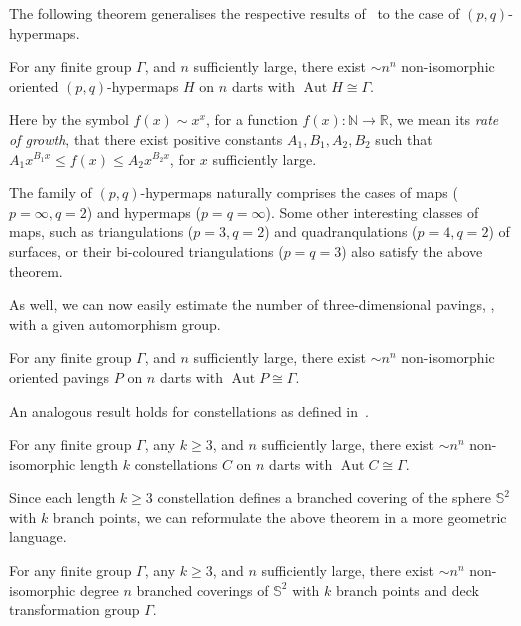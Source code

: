 \documentclass[ALCO,ThmDefs,Unicode,epreuves]{cedram}
\DeclareMathOperator{\aut}{Aut}
\begin{document}
The following theorem generalises the respective results of~\cite{CM, CM-Survey, Frucht, SirSko} to the case of $(p, q)$-hypermaps.

\begin{theo}\label{thm:p-q-hypermaps-symmetries}
For any finite group $\Gamma$, and $n$ sufficiently large, there exist $\sim n^n$ non-isomorphic oriented $(p,q)$-hypermaps $H$ on $n$ darts with $\aut H \cong \Gamma$. 
\end{theo}

Here by the symbol $f(x) \sim x^x$, for a function $f(x): \mathbb{N} \rightarrow \mathbb{R}$, we mean its \emph{rate of growth}, \ie that there exist positive constants $A_1, B_1, A_2, B_2$ such that $A_1 x^{B_1 x} \leq f(x) \leq A_2 x^{B_2 x}$, for $x$ sufficiently large. 

The family of $(p,q)$-hypermaps naturally comprises the cases of maps ($p = \infty, q = 2$) and hypermaps ($p = q = \infty$). Some other interesting classes of maps, such as triangulations ($p=3, q=2$) and quadranqulations ($p=4, q=2$) of surfaces, or their bi-coloured triangulations ($p = q = 3$) also satisfy the above theorem. 

As well, we can now easily estimate the number of three-dimensional pavings, %
\cf \cite{AK, CK2}, with a given automorphism group. 

\begin{theo}\label{thm:pavings-symmetries}
For any finite group $\Gamma$, and $n$ sufficiently large, there exist $\sim n^n$ non-isomorphic oriented pavings $P$ on $n$ darts with $\aut P \cong \Gamma$. 
\end{theo}	

An analogous result holds for constellations as defined in~\cite[Definition~1.1.1]{LZ}.

\begin{theo}\label{thm:constellations-symmetries}
For any finite group $\Gamma$, any $k\geq 3$, and $n$ sufficiently large, there exist $\sim n^n$ non-isomorphic length $k$ constellations $C$ on $n$ darts with $\aut C \cong \Gamma$. 
\end{theo}

Since each length $k\geq 3$ constellation defines a branched covering of the sphere $\mathbb{S}^2$ with $k$ branch points, we can reformulate the above theorem in a more geometric language.

\begin{theo}\label{thm:covering-symmetries}
For any finite group $\Gamma$, any $k\geq 3$, and $n$ sufficiently large, there exist $\sim n^n$ non-isomorphic degree $n$ branched coverings of $\mathbb{S}^2$ with $k$ branch points and deck transformation group $\Gamma$. 
\end{theo}
\end{document}
